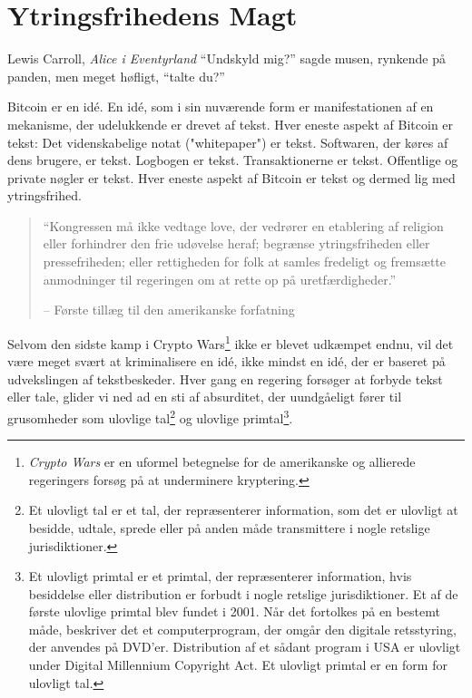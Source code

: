 
\chapter{Ytringsfrihedens Magt}
\label{les:6}

\begin{chapquote}{Lewis Carroll, \textit{Alice i Eventyrland}}
\enquote{Undskyld mig?} sagde musen, rynkende på panden, men meget høfligt, 
\enquote{talte du?}
\end{chapquote}

Bitcoin er en idé. En idé, som i sin nuværende form er manifestationen af en 
mekanisme, der udelukkende er drevet af tekst. Hver eneste aspekt af Bitcoin 
er tekst: Det videnskabelige notat ("whitepaper") er tekst. Softwaren, der køres
af dens brugere, er tekst. Logbogen er tekst. Transaktionerne er tekst. 
Offentlige og private nøgler er tekst. Hver eneste aspekt af Bitcoin er tekst 
og dermed lig med ytringsfrihed.

\begin{quotation}\begin{samepage}
\enquote{Kongressen må ikke vedtage love, der vedrører en etablering af religion
eller forhindrer den frie udøvelse heraf; begrænse ytringsfriheden 
eller pressefriheden; eller rettigheden for folk at samles fredeligt og
fremsætte anmodninger til regeringen om at rette op på uretfærdigheder.}
\begin{flushright} -- Første tillæg til den amerikanske forfatning
\end{flushright}\end{samepage}\end{quotation}

Selvom den sidste kamp i Crypto Wars\footnote{\textit{Crypto Wars} er en 
uformel betegnelse for de amerikanske og allierede regeringers forsøg på at 
underminere kryptering.\cite{eff-cryptowars}\cite{wiki:cryptowars}} ikke er 
blevet udkæmpet endnu, vil det være meget svært at kriminalisere en idé, ikke 
mindst en idé, der er baseret på udvekslingen af tekstbeskeder. Hver gang en 
regering forsøger at forbyde tekst eller tale, glider vi ned ad en sti af 
absurditet, der uundgåeligt fører til grusomheder som ulovlige tal\footnote{Et 
ulovligt tal er et tal, der repræsenterer information, som det er ulovligt at 
besidde, udtale, sprede eller på anden måde transmittere i nogle retslige 
jurisdiktioner.\cite{wiki:illegal-number}} og ulovlige primtal\footnote{Et 
ulovligt primtal er et primtal, der repræsenterer information, hvis besiddelse 
eller distribution er forbudt i nogle retslige jurisdiktioner. Et af de første 
ulovlige primtal blev fundet i 2001. Når det fortolkes på en bestemt måde, 
beskriver det et computerprogram, der omgår den digitale retsstyring, der 
anvendes på DVD'er. Distribution af et sådant program i USA er ulovligt under 
Digital Millennium Copyright Act. Et ulovligt primtal er en form for ulovligt 
tal.\cite{wiki:illegal-prime}}.

